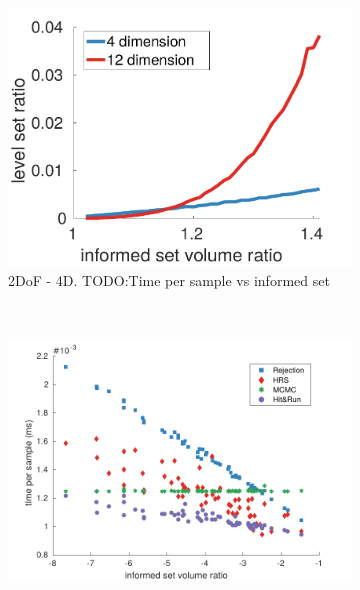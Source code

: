 \documentclass[letterpaper, 10 pt, conference]{ieeeconf}  %
\begin{document}
\begin{figure}[t!]
	\centering
	\begin{subfigure}[b]{0.78\linewidth}
		\includegraphics[width=\linewidth]{fig/sampling_efficiency/levelset}
		\caption{2DoF - 4D. TODO:Time per sample vs informed set}
		\label{fig:sampling_efficiency:levelset}
	\end{subfigure}
	 \\
	\begin{subfigure}[b]{0.78\linewidth}
		\includegraphics[width=\linewidth]{fig/sampling_efficiency/sample_efficiency_2d}

\end{subfigure}
\end{figure}
\end{document}
